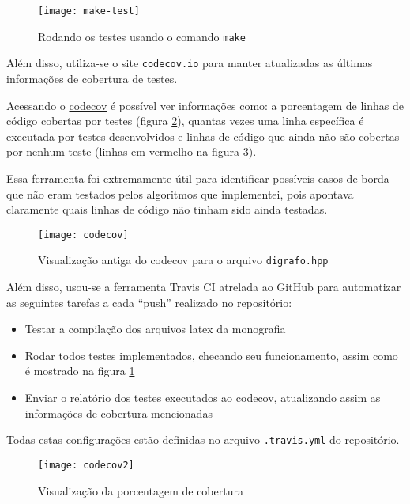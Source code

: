 \begin{figure}[ht]
    \centering
    \texttt{[image: make-test]}
    \caption{Rodando os testes usando o comando \texttt{make}}
    \label{maketest}
\end{figure}

Além disso, utiliza-se o site \texttt{codecov.io} para manter atualizadas as últimas informações de cobertura de testes.

Acessando o \href{https://codecov.io/gh/gafeol/chinese-postman}{codecov} é possível ver informações como: a porcentagem de linhas de código cobertas por testes (figura \ref{codecov}), quantas vezes uma linha específica é executada por testes desenvolvidos e linhas de código que ainda não são cobertas por nenhum teste (linhas em vermelho na figura \ref{codecov2}).

Essa ferramenta foi extremamente útil para identificar possíveis casos de borda que não eram testados pelos algoritmos que implementei, pois apontava claramente quais linhas de código não tinham sido ainda testadas.

\begin{figure}[ht]
    \centering
    \texttt{[image: codecov]}
    \caption{Visualização antiga do codecov para o arquivo \texttt{digrafo.hpp}}
    \label{codecov}
\end{figure}

Além disso, usou-se a ferramenta Travis CI atrelada ao GitHub para automatizar as seguintes tarefas a cada ``push'' realizado no repositório:

\begin{itemize}
    \item Testar a compilação dos arquivos latex da monografia
    \item Rodar todos testes implementados, checando seu funcionamento, assim como é mostrado na figura \ref{maketest}  
    \item Enviar o relatório dos testes executados ao codecov, atualizando assim as informações de cobertura mencionadas
\end{itemize}

Todas estas configurações estão definidas no arquivo \texttt{.travis.yml} do repositório.

\begin{figure}[ht]
    \centering
    \texttt{[image: codecov2]}
    \caption{Visualização da porcentagem de cobertura}
    \label{codecov2}
\end{figure}

